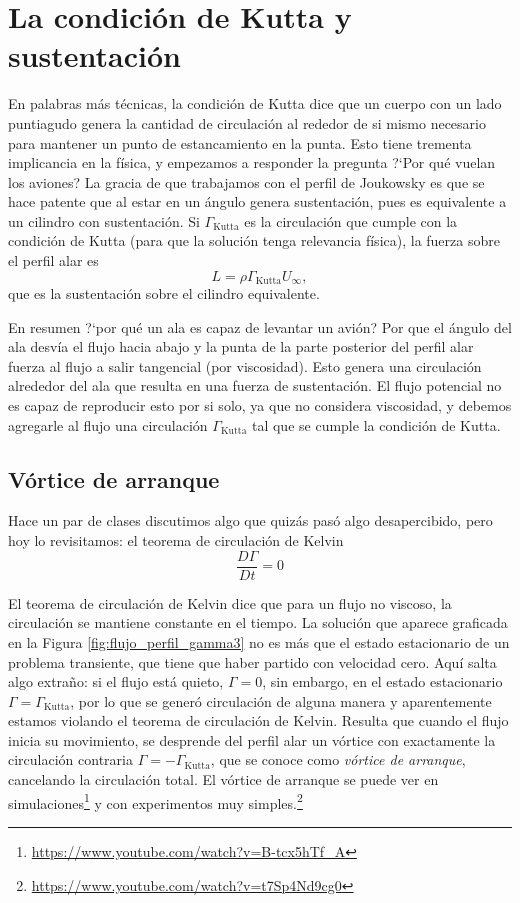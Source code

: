\section*{La condición de Kutta y sustentación}

En palabras más técnicas, la condición de Kutta dice que un cuerpo con un lado puntiagudo genera la cantidad de circulación al rededor de si mismo necesario para mantener un punto de estancamiento en la punta.
Esto tiene trementa implicancia en la física, y empezamos a responder la pregunta \mbox{?`}Por qué vuelan los aviones?
La gracia de que trabajamos con el perfil de Joukowsky es que se hace patente que al estar en un ángulo genera sustentación, pues es equivalente a un cilindro con sustentación.
Si $\Gamma_\text{Kutta}$ es la circulación que cumple con la condición de Kutta (para que la solución tenga relevancia física), la fuerza sobre el perfil alar es
%
\begin{equation}
L = \rho\Gamma_\text{Kutta}U_\infty,
\end{equation}
%
que es la sustentación sobre el cilindro equivalente.

En resumen \mbox{?`}por qué un ala es capaz de levantar un avión? Por que el ángulo del ala desvía el flujo hacia abajo y la punta de la parte posterior del perfil alar fuerza al flujo a salir tangencial (por viscosidad).
Esto genera una circulación alrededor del ala que resulta en una fuerza de sustentación.
El flujo potencial no es capaz de reproducir esto por si solo, ya que no considera viscosidad, y debemos agregarle al flujo una circulación $\Gamma_\text{Kutta}$ tal que se cumple la condición de Kutta.

\subsection*{Vórtice de arranque}
Hace un par de clases discutimos algo que quizás pasó algo desapercibido, pero hoy lo revisitamos: el teorema de circulación de Kelvin
%
\begin{equation}
\frac{D\Gamma}{Dt}=0
\end{equation}

El teorema de circulación de Kelvin dice que para un flujo no viscoso, la circulación se mantiene constante en el tiempo.
La solución que aparece graficada en la Figura \ref{fig:flujo_perfil_gamma3} no es más que el estado estacionario de un problema transiente, que tiene que haber partido con velocidad cero.
Aquí salta algo extraño: si el flujo está quieto, $\Gamma=0$, sin embargo, en el estado estacionario $\Gamma=\Gamma_\text{Kutta}$, por lo que se generó circulación de alguna manera y aparentemente estamos violando el teorema de circulación de Kelvin.
Resulta que cuando el flujo inicia su movimiento, se desprende del perfil alar un vórtice con exactamente la circulación contraria $\Gamma=-\Gamma_\text{Kutta}$, que se conoce como \emph{vórtice de arranque}, cancelando la circulación total.
El vórtice de arranque se puede ver en simulaciones\footnote{\url{https://www.youtube.com/watch?v=B-tcx5hTf_A}} y con experimentos muy simples.\footnote{\url{https://www.youtube.com/watch?v=t7Sp4Nd9cg0}}

